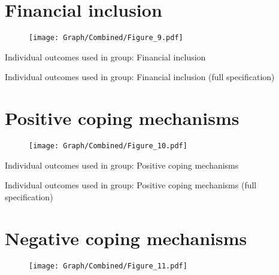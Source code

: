 \documentclass[10pt,a4paper]{article}
\begin{document}
\section{Financial inclusion}
\begin{table}[H]\centering

\end{table}
\begin{figure}[H]\centering
\texttt{[image: Graph/Combined/Figure\_9.pdf]}
\caption{} \label{fig:Fig_9}
\end{figure}

\begin{table}[H]\centering\caption{Individual outcomes used in group: Financial inclusion }
\resizebox{\textwidth}{!}{}
\end{table}
\begin{table}[H]\centering\caption{Individual outcomes used in group: Financial inclusion (full specification)}
\resizebox{\textwidth}{!}{}
\end{table}
\pagebreak
\section{Positive coping mechanisms}
\begin{table}[H]\centering

\end{table}
\begin{figure}[H]\centering
\texttt{[image: Graph/Combined/Figure\_10.pdf]}
\caption{} \label{fig:Fig_10}
\end{figure}

\begin{table}[H]\centering\caption{Individual outcomes used in group: Positive coping mechanisms }
\resizebox{\textwidth}{!}{}
\end{table}
\begin{table}[H]\centering\caption{Individual outcomes used in group: Positive coping mechanisms (full specification)}
\resizebox{\textwidth}{!}{}
\end{table}
\pagebreak
\section{Negative coping mechanisms}
\begin{table}[H]\centering

\end{table}
\begin{figure}[H]\centering
\texttt{[image: Graph/Combined/Figure\_11.pdf]}
\caption{} \label{fig:Fig_11}
\end{figure}
\end{document}
